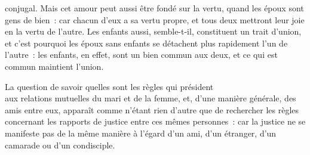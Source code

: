 \documentclass[french,twoside]{book} %
\begin{document}
conjugal. Mais cet amour peut aussi être fondé sur la vertu, quand les époux sont gens de bien : car chacun d’eux a sa vertu propre, et tous deux mettront leur joie en la vertu de l’autre. Les enfants aussi, semble-t-il, constituent un trait d’union, et c’est pourquoi les époux sans enfants se détachent plus rapidement l’un de l’autre : les enfants, en effet, sont un bien commun aux deux, et ce qui est commun maintient l’union.\par
La question de savoir quelles sont les règles qui président \\
aux relations mutuelles du mari et de la femme, et, d’une manière générale, des amis entre eux, apparaît comme n’étant rien d’autre que de rechercher les règles concernant les rapports de justice entre ces mêmes personnes : car la justice ne se manifeste pas de la même manière à l’égard d’un ami, d’un étranger, d’un camarade ou d’un condisciple.
\end{document}
